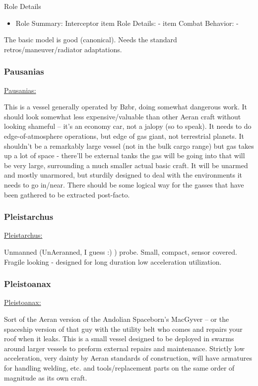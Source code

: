 Role Details
\begin{itemize}
\item Role Summary: Interceptor
item Role Details: -
item Combat Behavior: -
\end{itemize}

The basic model is good (canonical). Needs the standard retros/maneuver/radiator
adaptations.


\subsubsection{Pausanias}
\href{http://vegastrike.sourceforge.net/wiki/Vessel:Pausanias}{Pausanias:}

This is a vessel generally operated by Bzbr, doing somewhat dangerous
work. It should look somewhat less expensive/valuable than other Aeran
craft without looking shameful -- it's an economy car, not a jalopy
(so to speak). It needs to do edge-of-atmosphere operations, but edge
of gas giant, not terrestrial planets. It shouldn't be a remarkably
large vessel (not in the bulk cargo range) but gas takes up a lot of
space - there'll be external tanks the gas will be going into that
will be very large, surrounding a much smaller actual basic craft. It
will be unarmed and mostly unarmored, but sturdily designed to deal
with the environments it needs to go in/near. There should be some
logical way for the gasses that have been gathered to be extracted
post-facto.


\subsubsection{Pleistarchus}
\href{http://vegastrike.sourceforge.net/wiki/Vessel:Pleistarchus}{Pleistarchus:}

Unmanned (UnAeranned, I guess :) ) probe. Small, compact, sensor
covered. Fragile looking - designed for long duration low acceleration
utilization.

\subsubsection{Pleistoanax}
\href{http://vegastrike.sourceforge.net/wiki/Vessel:Pleistoanax}{Pleistoanax:}

Sort of the Aeran version of the Andolian Spaceborn's MacGyver -- or
the spaceship version of that guy with the utility belt who comes and
repairs your roof when it leaks. This is a small vessel designed to be
deployed in swarms around larger vessels to preform external repairs
and maintenance. Strictly low acceleration, very dainty by Aeran standards of
construction, will have armatures for handling welding, etc. and
tools/replacement parts on the same order of magnitude as its own
craft.


